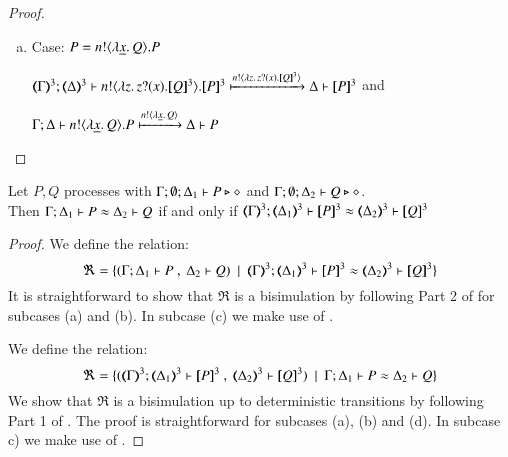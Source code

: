 \begin{proof}
\begin{enumerate}
\begin{enumerate}[a)]
		\item	Case: $P = n ! \langle \lambda \underline{x}.\,Q \rangle . P$

			$\horel{\tmap{\Gamma}{3}}{\tmap{\Delta}{3}}{\bout{n}{\abs{z} \binp{z}{x} \pmap{Q}{3}} \pmap{P}{3}}{\hby{ \bactout{n}{\abs{z}{\binp{z}{x} \pmap{Q}{3}} } }}{\Delta}{\pmap{P}{3}}$ and

			$\Gamma; \Delta \vdash n ! \langle \lambda \underline{x}.\,Q \rangle . P \xmapsto{ n !\langle \lambda \underline{x}.\,Q \rangle} \Delta \vdash P$
	\end{enumerate}
\end{enumerate}
\end{proof}

\begin{proposition}\myrm
	\label{app:prop:fulla_HOpp_to_HOp}
	Let $P, Q$ \HOpp processes with $\Gamma; \emptyset; \Delta_1 \vdash P \triangleright \diamond$ and 
	$\Gamma; \emptyset; \Delta_2 \vdash Q \triangleright \diamond$. \\
	Then 
	$\Gamma; \Delta_1 \vdash P \approx \Delta_2 \vdash Q$ if and only if $\horel{\tmap{\Gamma}{3}}{\tmap{\Delta_1}{3}}{\pmap{P}{3}}{\wb}{\tmap{\Delta_2}{3}}{\pmap{Q}{3}}$
\end{proposition}

\begin{proof}
	 We define the relation:
%
	\[
		\Re = \set{(\horel{\Gamma}{\Delta_1}{P}{\ ,\ }{\Delta_2}{Q}) \setbar \horel{\tmap{\Gamma}{3}}{\tmap{\Delta_1}{3}}{\pmap{P}{3}}{\wb}{\tmap{\Delta_2}{3}}{\pmap{Q}{3}}}
	\]
%
	\noi	It is straightforward to show that $\Re$ is a bisimulation by following Part 2 of
		 for subcases (a) and (b).
		In subcase (c) we make use of .

	 We define the relation:
%
	\[
		\Re = \set{(\horel{\tmap{\Gamma}{3}}{\tmap{\Delta_1}{3}}{\pmap{P}{3}}{\ ,\ }{\tmap{\Delta_2}{3}}{\pmap{Q}{3}}) \setbar \horel{\Gamma}{\Delta_1}{P}{\wb}{\Delta_2}{Q}}
	\]
%
	\noi	We show that $\Re$ is a bisimulation up to deterministic transitions
		by following Part 1 of .
		The proof is straightforward for subcases (a), (b) and (d).
		In subcase c) we make use of .
\end{proof}






